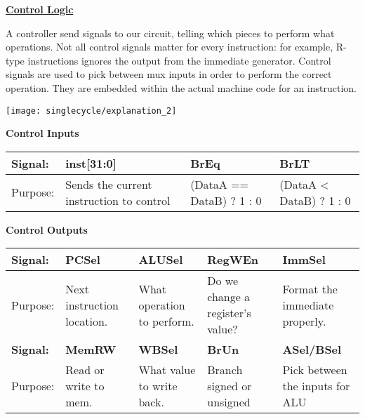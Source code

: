 \begin{blocksection}

\textbf{\underline{Control Logic}}

A controller send signals to our circuit, telling which pieces to perform what operations.  Not all control signals matter for every instruction: for example, R-type instructions ignores the output from the immediate generator.  Control signals are used to pick between mux inputs in order to perform the correct operation.  They are embedded within the actual machine code for an instruction.

\texttt{[image: singlecycle/explanation\_2]}

\textbf{Control Inputs}
\newline
\newline
\begin{tabular}{ |l|l|l|l| } 
 \hline
 \textbf{Signal:} & \textbf{inst[31:0]} & \textbf{BrEq} & \textbf{BrLT} \\ 
 \hline
 Purpose: & Sends the current instruction to control & (DataA == DataB) ? 1 : 0 & (DataA < DataB) ? 1 : 0 \\ 
 \hline
\end{tabular}

\bigskip
\textbf{Control Outputs}
\newline
\newline
\begin{tabular}{ |l|l|l|l|l| } 
 \hline
 \textbf{Signal:} & \textbf{PCSel} & \textbf{ALUSel} & \textbf{RegWEn} & \textbf{ImmSel} \\ 
 \hline
 Purpose: & Next instruction location. & What operation to perform. & Do we change a register’s value? & Format the immediate properly. \\ 
 \hline
 \textbf{Signal:} & \textbf{MemRW} & \textbf{WBSel} & \textbf{BrUn} & \textbf{ASel/BSel} \\
 \hline 
 Purpose: & Read or write to mem. & What value to write back. & Branch signed or unsigned & Pick between the inputs for ALU \\
 \hline
\end{tabular}

\end{blocksection}